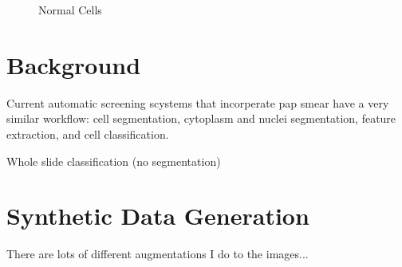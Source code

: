 \documentclass[ms,electronic,oneside,twosidetoc,letterpaper,chaptercenter,parttop]{byumsphd}
\begin{document}
\begin{figure}[H]
  \centering
   \quad
   \quad
  \caption{Normal Cells}
\end{figure}


\chapter{Background}

Current automatic screening scystems that incorperate pap smear have a very similar workflow: cell segmentation, cytoplasm and nuclei segmentation, feature extraction, and cell classification.

Whole slide classification (no segmentation) \cite{kiran}

\chapter{Synthetic Data Generation}

There are lots of different augmentations I do to the images...
\end{document}
